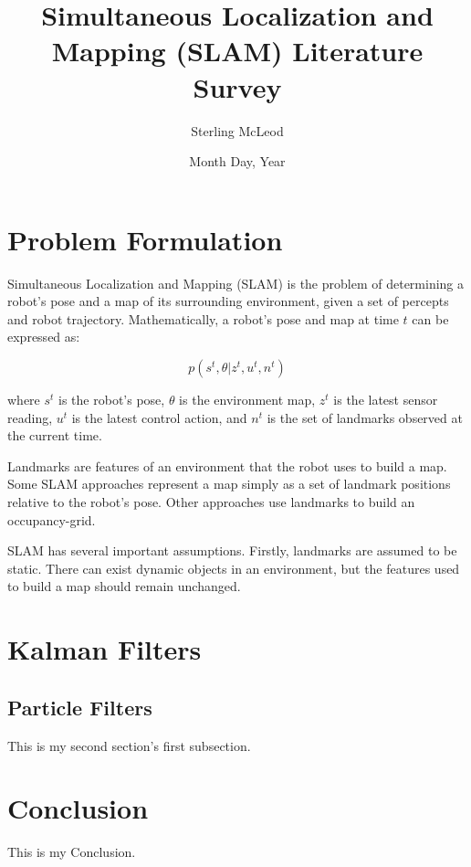\documentclass[10pt,conference]{ieeeconf}
\begin{document}
\author{Sterling McLeod}
\title {Simultaneous Localization and Mapping (SLAM) Literature Survey}
\date {Month Day, Year}

\maketitle


\section {Problem Formulation}
    Simultaneous Localization and Mapping (SLAM) is the problem of determining a robot's pose and a map of its surrounding environment, given a set of percepts and robot trajectory. Mathematically, a robot's pose and map at time $t$ can be expressed as:
    
    \begin{equation}
    p(s^t,\theta | z^t, u^t, n^t)
    \end{equation}
    
    where $s^t$ is the robot's pose, $\theta$ is the environment map, $z^t$ is the latest sensor reading, $u^t$ is the latest control action, and $n^t$ is the set of landmarks observed at the current time.
    
    Landmarks are features of an environment that the robot uses to build a map. Some SLAM approaches represent a map simply as a set of landmark positions relative to the robot's pose. Other approaches use landmarks to build an occupancy-grid.
    
    SLAM has several important assumptions. Firstly, landmarks are assumed to be static. There can exist dynamic objects in an environment, but the features used to build a map should remain unchanged.

\section {Kalman Filters}
    

\subsection {Particle Filters}
    This is my second section's first subsection.

\section {Conclusion}
    This is my Conclusion.




\end{document}
